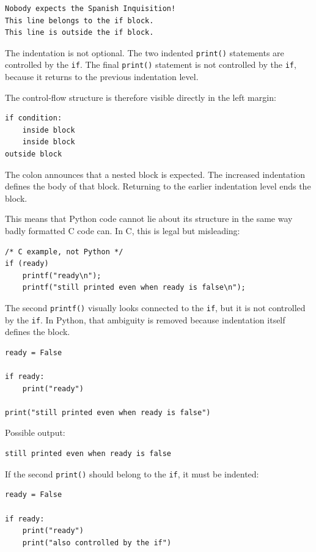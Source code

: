 \begin{verbatim}
Nobody expects the Spanish Inquisition!
This line belongs to the if block.
This line is outside the if block.
\end{verbatim}

The indentation is not optional. The two indented \texttt{print()} statements are controlled by the \texttt{if}. The final \texttt{print()} statement is not controlled by the \texttt{if}, because it returns to the previous indentation level.

The control-flow structure is therefore visible directly in the left margin:

\begin{verbatim}
if condition:
    inside block
    inside block
outside block
\end{verbatim}

The colon announces that a nested block is expected. The increased indentation defines the body of that block. Returning to the earlier indentation level ends the block.

This means that Python code cannot lie about its structure in the same way badly formatted C code can. In C, this is legal but misleading:

\begin{verbatim}
/* C example, not Python */
if (ready)
    printf("ready\n");
    printf("still printed even when ready is false\n");
\end{verbatim}

The second \texttt{printf()} visually looks connected to the \texttt{if}, but it is not controlled by the \texttt{if}. In Python, that ambiguity is removed because indentation itself defines the block.

\begin{verbatim}
ready = False

if ready:
    print("ready")

print("still printed even when ready is false")
\end{verbatim}

Possible output:

\begin{verbatim}
still printed even when ready is false
\end{verbatim}

If the second \texttt{print()} should belong to the \texttt{if}, it must be indented:

\begin{verbatim}
ready = False

if ready:
    print("ready")
    print("also controlled by the if")
\end{verbatim}

